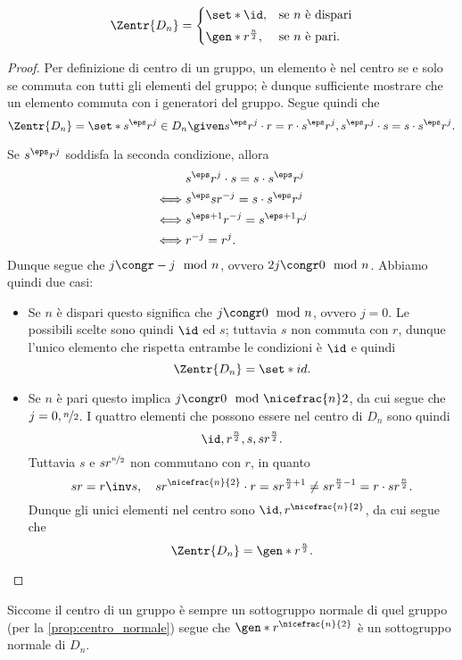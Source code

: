 \begin{proposition}
    \[
        \Zentr{D_n} = \begin{cases}
            \set*{\id}, &\text{se } n \text{ è dispari}\\[3pt]
            \gen*{r^{\frac{n}2}}, &\text{se $n$ è pari}.
        \end{cases}   
    \]
\end{proposition}
\begin{proof}
    Per definizione di centro di un gruppo, un elemento è nel centro se e solo se commuta con tutti gli elementi del gruppo; è dunque sufficiente mostrare che un elemento commuta con i generatori del gruppo. Segue quindi che \[
        \Zentr{D_n} = \set*{s^\eps r^j \in D_n \given s^\eps r^j \cdot r = r \cdot s^\eps r^j, s^\eps r^j \cdot s = s \cdot s^\eps r^j}.
    \]

    Se $s^\eps r^j$ soddisfa la seconda condizione, allora \begin{align*}
        &s^\eps r^j \cdot s = s \cdot s^\eps r^j \\
        \iff &s^\eps sr^{-j} = s \cdot s^\eps r^j  \\
        \iff &s^{\eps + 1}r^{-j} = s^{\eps + 1} r^j\\
        \iff &r^{-j} = r^j.
    \end{align*} Dunque segue che $j \congr -j \mod{n}$, ovvero $2j \congr 0 \mod{n}$. Abbiamo quindi due casi:
    \begin{itemize}
        \item Se $n$ è dispari questo significa che $j \congr 0 \mod{n}$, ovvero $j = 0$. 
        Le possibili scelte sono quindi $\id$ ed $s$; tuttavia $s$ non commuta con $r$, dunque l'unico elemento che rispetta entrambe le condizioni è $\id$ e quindi \[
            \Zentr{D_n} = \set*{id}.    
        \]
        \item Se $n$ è pari questo implica $j \congr 0 \mod{\nicefrac{n}2}$, da cui segue che $j = 0, \nicefrac{n}2$. I quattro elementi che possono essere nel centro di $D_n$ sono quindi \[
            \id, r^{\frac{n}2}, s, sr^\frac{n}{2}.   
        \] Tuttavia $s$ e $sr^{\nicefrac{n}{2}}$ non commutano con $r$, in quanto \[
            sr = r\inv s, \quad sr^{\nicefrac{n}{2}} \cdot r = sr^{\frac{n}{2} + 1} \neq sr^{\frac{n}{2} - 1} = r \cdot sr^\frac{n}{2}.
    \]  Dunque gli unici elementi nel centro sono $\id, r^{\nicefrac{n}{2}}$, da cui segue che \[
        \Zentr{D_n} = \gen*{r^\frac{n}{2}}. \qedhere    
    \]
    \end{itemize}
\end{proof}

Siccome il centro di un gruppo è sempre un sottogruppo normale di quel gruppo (per la \autoref{prop:centro_normale}) segue che $\gen*{r^{\nicefrac{n}{2}}}$ è un sottogruppo normale di $D_n$.